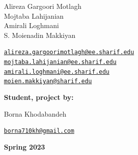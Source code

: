 \documentclass[12pt]{article}
\begin{document}
\begin{center}
	\begin{minipage}{0.5\textwidth}
		\begin{flushleft}
			Alireza Gargoori Motlagh\\
			Mojtaba Lahijanian\\
			Amirali Loghmani\\
			S. Moienadin Makkiyan
		\end{flushleft}
	\end{minipage}%
	\begin{minipage}{0.5\textwidth}
		\begin{flushright}
			\href{mailto:alireza.gargoorimotlagh@ee.sharif.edu}{\texttt{alireza.gargoorimotlagh@ee.sharif.edu}}\\

			\href{mojtaba.lahijanian@ee.sharif.edu}{\texttt{mojtaba.lahijanian@ee.sharif.edu}}\\
			\href{mailto:amirali.loghmani@ee.sharif.edu}
			{\texttt{amirali.loghmani@ee.sharif.edu}}\\

			\href{mailto:moien.makkiyan@sharif.edu}{\texttt{moien.makkiyan@sharif.edu}}

		\end{flushright}
	\end{minipage}
\end{center}

\vspace*{0.5em}

\begin{flushleft}
	\textbf{\selectfont Student, project by:}
\end{flushleft}

\begin{center}
	\begin{minipage}{0.5\textwidth}
		\begin{flushleft}
			Borna Khodabandeh
		\end{flushleft}
	\end{minipage}%
	\begin{minipage}{0.5\textwidth}
		\begin{flushright}
			\href{mailto:borna710kh@gmail.com}{\texttt{borna710kh@gmail.com}}\\
		\end{flushright}
	\end{minipage}
\end{center}

\begin{center}
	\bigskip \bigskip \bigskip \bigskip
	\large \bf {}\selectfont Spring 2023
\end{center}
\end{document}
